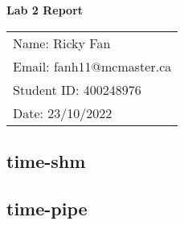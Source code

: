 \documentclass[11pt,fleqn]{article}
\begin{document}
\begin{center}
	{\Large \textbf{Lab 2 Report}}\\[6mm]
	\begin{tabular}{l}
        {\large Name: Ricky Fan}       \\
		{\large Email: fanh11@mcmaster.ca} \\
		{\large Student ID: 400248976}    \\
		{\large Date: 23/10/2022}
	\end{tabular}

\end{center}

\medskip

\subsection*{time-shm}

\noindent 



\medskip

\subsection*{time-pipe}

\noindent 


\end{document}

